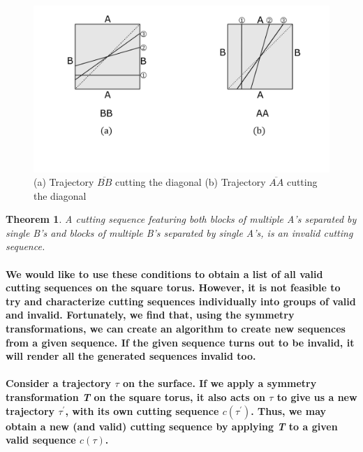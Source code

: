 \documentclass{report}
\newtheorem{theorem}{Theorem}[chapter]
\begin{document}
\begin{figure}[h] 
\begin{center}
\includegraphics[scale=0.3]{2.9}
\caption{(a) Trajectory $\overline{BB}$ cutting the diagonal (b) Trajectory $\overline{AA}$ cutting the diagonal
}
\end{center}
\end{figure}

\begin{theorem}
A cutting sequence featuring both blocks of multiple A’s separated by single B’s and blocks of multiple B’s separated by single A’s, is an invalid cutting sequence.
\end{theorem}

\paragraph{We would like to use these conditions to obtain a list of all valid cutting sequences on the square torus. However, it is not feasible to try and characterize cutting sequences individually into groups of valid and invalid. Fortunately, we find that, using the symmetry transformations, we can create an algorithm to create new sequences from a given sequence. If the given sequence turns out to be invalid, it will render all the generated sequences invalid too.}

\paragraph{Consider a trajectory $\tau$ on the surface. If we apply a symmetry transformation \textit{T} on the square torus, it also acts on $\tau$ to give us a new trajectory $\tau^{'}$, with its own cutting sequence $c(\tau^{'})$. Thus, we may obtain a new (and valid) cutting sequence by applying \textit{T} to a given valid sequence  $c(\tau)$.}
\end{document}
